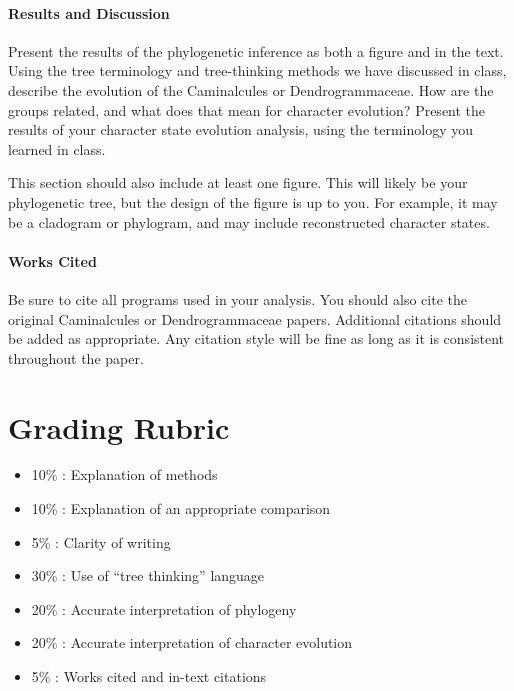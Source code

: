 \documentclass[12pt]{article}
\begin{document}
\paragraph{Results and Discussion}
Present the results of the phylogenetic inference as both a figure and in the text.
Using the tree terminology and tree-thinking methods we have discussed in class, describe the evolution of the Caminalcules or Dendrogrammaceae.
How are the groups related, and what does that mean for character evolution?
Present the results of your character state evolution analysis, using the terminology you learned in class.

This section should also include at least one figure.
This will likely be your phylogenetic tree, but the design of the figure is up to you. 
For example, it may be a cladogram or phylogram, and may include reconstructed character states.

\paragraph{Works Cited}
Be sure to cite all programs used in your analysis. 
You should also cite the original Caminalcules or Dendrogrammaceae papers.
Additional citations should be added as appropriate. 
Any citation style will be fine as long as it is consistent throughout the paper.


\section{Grading Rubric}
\begin{multicols}{2}
\begin{itemize}
\itemsep0em
\item 10\% : Explanation of methods
\item10\% : Explanation of an appropriate comparison
\item5\% : Clarity of writing
\item30\% : Use of ``tree thinking'' language
\item20\% : Accurate interpretation of phylogeny
\item20\% : Accurate interpretation of character evolution
\item5\% : Works cited and in-text citations
\end{itemize}
\end{multicols}
\end{document}
